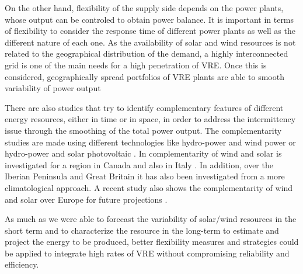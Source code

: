 On the other hand, flexibility of the supply side depends on the power plants, whose output can be controled to obtain power balance. It is important in terms of flexibility to consider the response time of different power plants as well as the different nature of each one. As the availability of solar and wind resources is not related to the geographical distribution of the demand, a highly interconnected grid is one of the main needs for a high penetration of VRE. Once this is considered, geographically spread portfolios of VRE plants are able to smooth variability of power output \cite*{KROPOSKI2017, Marcos2012, Hoff2010, Hoff2012}


There are also studies that try to identify complementary features of different energy resources, either in time or in space, in order to address the intermittency issue through the smoothing of the total power output. The complementarity studies are made using different technologies like hydro-power and wind power \cite*{Denault2009, Silva2016} or hydro-power and solar photovoltaic \cite*{Francois2016, Beluco2012, Kougias2016}. In \cite*{Hoicka2011} complementarity of wind and solar is investigated for a region in Canada and also in Italy \cite*{Monforti2014}.  In addition, over the Iberian Peninsula \cite*{Santos-Alamillos2012, Jerez2013b} and Great Britain \cite*{Bett2016} it has also been investigated from a more climatological approach. A recent study also shows the complementarity of wind and solar over Europe for future projections \cite*{Jerez2019}.

As much as we were able to forecast the variability of solar/wind resources in the short term and to characterize the resource in the long-term to estimate and project the energy to be produced, better flexibility measures and strategies could be applied to integrate high rates of VRE without compromising reliability and efficiency.

